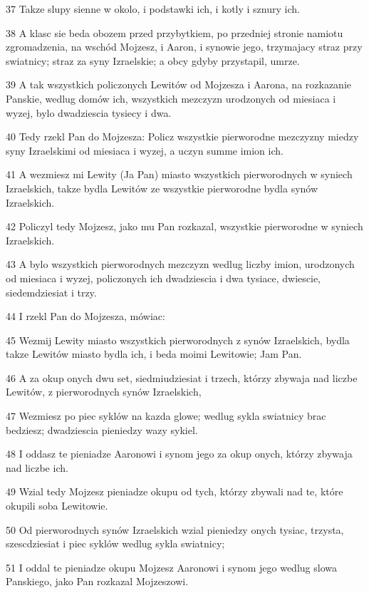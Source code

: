 \par 37 Takze slupy sienne w okolo, i podstawki ich, i kotly i sznury ich.
\par 38 A klasc sie beda obozem przed przybytkiem, po przedniej stronie namiotu zgromadzenia, na wschód Mojzesz, i Aaron, i synowie jego, trzymajacy straz przy swiatnicy; straz za syny Izraelskie; a obcy gdyby przystapil, umrze.
\par 39 A tak wszystkich policzonych Lewitów od Mojzesza i Aarona, na rozkazanie Panskie, wedlug domów ich, wszystkich mezczyzn urodzonych od miesiaca i wyzej, bylo dwadziescia tysiecy i dwa.
\par 40 Tedy rzekl Pan do Mojzesza: Policz wszystkie pierworodne mezczyzny miedzy syny Izraelskimi od miesiaca i wyzej, a uczyn summe imion ich.
\par 41 A wezmiesz mi Lewity (Ja Pan) miasto wszystkich pierworodnych w syniech Izraelskich, takze bydla Lewitów ze wszystkie pierworodne bydla synów Izraelskich.
\par 42 Policzyl tedy Mojzesz, jako mu Pan rozkazal, wszystkie pierworodne w syniech Izraelskich.
\par 43 A bylo wszystkich pierworodnych mezczyzn wedlug liczby imion, urodzonych od miesiaca i wyzej, policzonych ich dwadziescia i dwa tysiace, dwiescie, siedemdziesiat i trzy.
\par 44 I rzekl Pan do Mojzesza, mówiac:
\par 45 Wezmij Lewity miasto wszystkich pierworodnych z synów Izraelskich, bydla takze Lewitów miasto bydla ich, i beda moimi Lewitowie; Jam Pan.
\par 46 A za okup onych dwu set, siedmiudziesiat i trzech, którzy zbywaja nad liczbe Lewitów, z pierworodnych synów Izraelskich,
\par 47 Wezmiesz po piec syklów na kazda glowe; wedlug sykla swiatnicy brac bedziesz; dwadziescia pieniedzy wazy sykiel.
\par 48 I oddasz te pieniadze Aaronowi i synom jego za okup onych, którzy zbywaja nad liczbe ich.
\par 49 Wzial tedy Mojzesz pieniadze okupu od tych, którzy zbywali nad te, które okupili soba Lewitowie.
\par 50 Od pierworodnych synów Izraelskich wzial pieniedzy onych tysiac, trzysta, szescdziesiat i piec syklów wedlug sykla swiatnicy;
\par 51 I oddal te pieniadze okupu Mojzesz Aaronowi i synom jego wedlug slowa Panskiego, jako Pan rozkazal Mojzeszowi.

